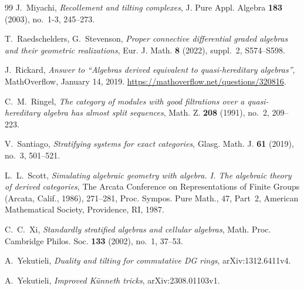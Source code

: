 \documentclass[a4paper,reqno,11pt]{amsart}
\numberwithin{equation}{section}
\theoremstyle{definition}
\begin{document}
\begin{thebibliography}{99}
 J.~Miyachi, \emph{Recollement and tilting complexes}, J. Pure Appl. Algebra \textbf{183} (2003), no.~1-3, 245--273.

 T.~Raedschelders, G.~Stevenson, \emph{Proper connective differential graded algebras and their geometric realizations}, Eur. J. Math. \textbf{8} (2022), suppl.~2, S574--S598.

 J.~Rickard, \emph{Answer to ``Algebras derived equivalent to quasi-hereditary algebras''}, MathOverflow, January 14, 2019. \url{https://mathoverflow.net/questions/320816}.

 C.~M.~Ringel, \emph{The category of modules with good filtrations over a quasi-hereditary algebra has almost split sequences}, Math. Z. \textbf{208} (1991), no.~2, 209--223.

 V.~Santiago, \emph{Stratifying systems for exact categories}, Glasg. Math. J. \textbf{61} (2019), no.~3, 501--521.

 L.~L.~Scott, \emph{Simulating algebraic geometry with algebra. I. The algebraic theory of derived categories}, The Arcata Conference on Representations of Finite Groups
(Arcata, Calif., 1986), 271--281, Proc. Sympos. Pure Math., 47, Part~2, American Mathematical Society, Providence, RI, 1987.

 C.~C.~Xi, \emph{Standardly stratified algebras and cellular algebras}, Math. Proc. Cambridge Philos. Soc. \textbf{133} (2002), no.~1, 37--53.

 A.~Yekutieli, \emph{Duality and tilting for commutative DG rings}, arXiv:1312.6411v4.

 A.~Yekutieli, \emph{Improved K\"unneth tricks}, arXiv:2308.01103v1.

\end{thebibliography}
\end{document}
